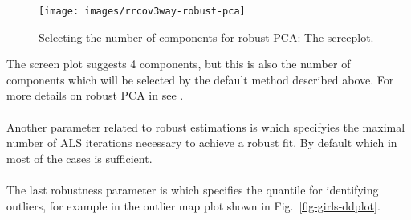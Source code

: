 \documentclass[article,shortnames, nojss]{jss}
\begin{document}
\begin{figure}[H]
\centering
\texttt{[image: images/rrcov3way-robust-pca]}\\
\caption{Selecting the number of components for robust PCA: The screeplot.}
\label{fig-robust-pca}
\end{figure}
The screen plot suggests 4 components, but this is also the number of components
which will be selected by the default method described above.
For more details on robust PCA in  see \citep{todorov-oof}.\\\\
Another parameter related to robust estimations is  which
specifyies the maximal number of ALS iterations necessary to achieve a robust fit.
By default  which in most of the cases is sufficient.\\\\
The last robustness parameter is  which specifies the quantile
for identifying outliers, for example in the outlier map plot
shown in Fig.~\ref{fig-girls-ddplot}.
\end{document}
